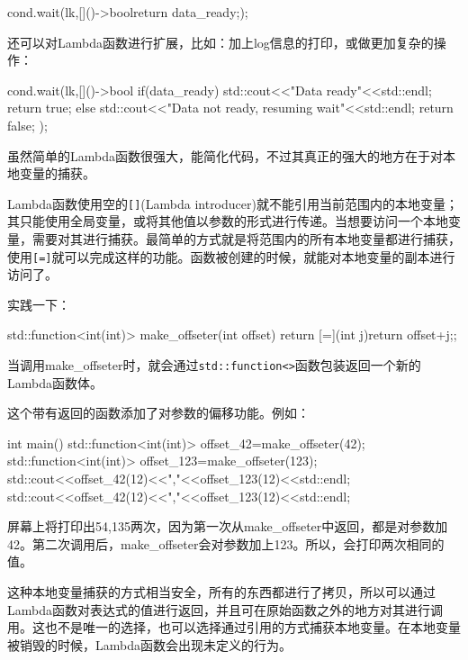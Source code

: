 \begin{cpp}
cond.wait(lk,[]()->bool{return data_ready;});
\end{cpp}

还可以对Lambda函数进行扩展，比如：加上log信息的打印，或做更加复杂的操作：

\begin{cpp}
cond.wait(lk,[]()->bool{
  if(data_ready)
  {
    std::cout<<"Data ready"<<std::endl;
    return true;
  }
  else
  {
    std::cout<<"Data not ready, resuming wait"<<std::endl;
    return false;
  }
});
\end{cpp}

虽然简单的Lambda函数很强大，能简化代码，不过其真正的强大的地方在于对本地变量的捕获。


Lambda函数使用空的\texttt{[]}(Lambda introducer)就不能引用当前范围内的本地变量；其只能使用全局变量，或将其他值以参数的形式进行传递。当想要访问一个本地变量，需要对其进行捕获。最简单的方式就是将范围内的所有本地变量都进行捕获，使用\texttt{[=]}就可以完成这样的功能。函数被创建的时候，就能对本地变量的副本进行访问了。

实践一下：

\begin{cpp}
std::function<int(int)> make_offseter(int offset)
{
  return [=](int j){return offset+j;};
}
\end{cpp}

当调用make\_offseter时，就会通过\texttt{std::function<>}函数包装返回一个新的Lambda函数体。

这个带有返回的函数添加了对参数的偏移功能。例如：

\begin{cpp}
int main()
{
  std::function<int(int)> offset_42=make_offseter(42);
  std::function<int(int)> offset_123=make_offseter(123);
  std::cout<<offset_42(12)<<","<<offset_123(12)<<std::endl;
  std::cout<<offset_42(12)<<","<<offset_123(12)<<std::endl;
}
\end{cpp}

屏幕上将打印出54,135两次，因为第一次从make\_offseter中返回，都是对参数加42。第二次调用后，make\_offseter会对参数加上123。所以，会打印两次相同的值。

这种本地变量捕获的方式相当安全，所有的东西都进行了拷贝，所以可以通过Lambda函数对表达式的值进行返回，并且可在原始函数之外的地方对其进行调用。这也不是唯一的选择，也可以选择通过引用的方式捕获本地变量。在本地变量被销毁的时候，Lambda函数会出现未定义的行为。

